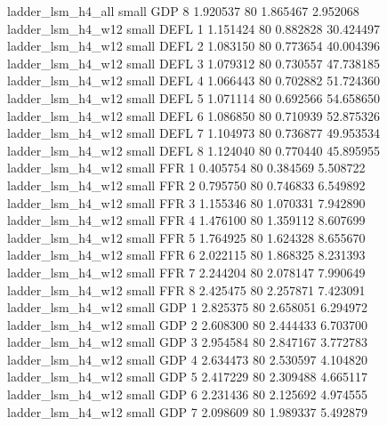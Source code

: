        ladder_lsm_h4_all      small      GDP                 8 1.920537 80       1.865467           2.952068
       ladder_lsm_h4_w12      small     DEFL                 1 1.151424 80       0.882828          30.424497
       ladder_lsm_h4_w12      small     DEFL                 2 1.083150 80       0.773654          40.004396
       ladder_lsm_h4_w12      small     DEFL                 3 1.079312 80       0.730557          47.738185
       ladder_lsm_h4_w12      small     DEFL                 4 1.066443 80       0.702882          51.724360
       ladder_lsm_h4_w12      small     DEFL                 5 1.071114 80       0.692566          54.658650
       ladder_lsm_h4_w12      small     DEFL                 6 1.086850 80       0.710939          52.875326
       ladder_lsm_h4_w12      small     DEFL                 7 1.104973 80       0.736877          49.953534
       ladder_lsm_h4_w12      small     DEFL                 8 1.124040 80       0.770440          45.895955
       ladder_lsm_h4_w12      small      FFR                 1 0.405754 80       0.384569           5.508722
       ladder_lsm_h4_w12      small      FFR                 2 0.795750 80       0.746833           6.549892
       ladder_lsm_h4_w12      small      FFR                 3 1.155346 80       1.070331           7.942890
       ladder_lsm_h4_w12      small      FFR                 4 1.476100 80       1.359112           8.607699
       ladder_lsm_h4_w12      small      FFR                 5 1.764925 80       1.624328           8.655670
       ladder_lsm_h4_w12      small      FFR                 6 2.022115 80       1.868325           8.231393
       ladder_lsm_h4_w12      small      FFR                 7 2.244204 80       2.078147           7.990649
       ladder_lsm_h4_w12      small      FFR                 8 2.425475 80       2.257871           7.423091
       ladder_lsm_h4_w12      small      GDP                 1 2.825375 80       2.658051           6.294972
       ladder_lsm_h4_w12      small      GDP                 2 2.608300 80       2.444433           6.703700
       ladder_lsm_h4_w12      small      GDP                 3 2.954584 80       2.847167           3.772783
       ladder_lsm_h4_w12      small      GDP                 4 2.634473 80       2.530597           4.104820
       ladder_lsm_h4_w12      small      GDP                 5 2.417229 80       2.309488           4.665117
       ladder_lsm_h4_w12      small      GDP                 6 2.231436 80       2.125692           4.974555
       ladder_lsm_h4_w12      small      GDP                 7 2.098609 80       1.989337           5.492879
